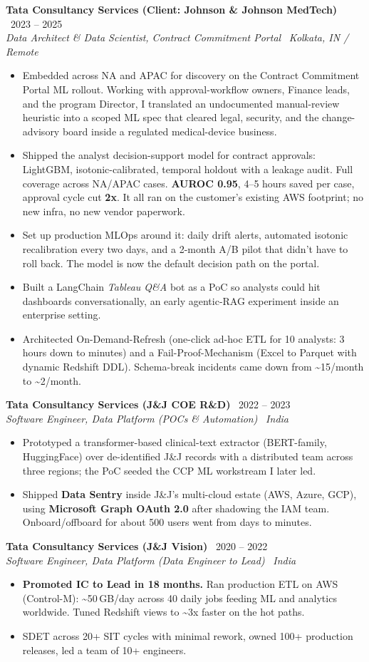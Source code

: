 \documentclass[letterpaper,11pt]{article}
\newcommand{\resumeItem}[1]{\item\small{{#1 \vspace{-2pt}}}}
\newcommand{\resumeSubheading}[4]{
  \vspace{-1pt}\item
    \textbf{#1} \textbar\ #2 \\
    \textit{#3} \textbar\ \textit{#4}
  \vspace{-5pt}
}
\newcommand{\resumeItemListStart}{\begin{itemize}}
\newcommand{\resumeItemListEnd}{\end{itemize}\vspace{-5pt}}
\begin{document}
  \resumeSubheading
    {Tata Consultancy Services (Client: Johnson \& Johnson MedTech)}{2023 -- 2025}
    {Data Architect \& Data Scientist, Contract Commitment Portal}{Kolkata, IN / Remote}
    \resumeItemListStart
      \resumeItem{Embedded across NA and APAC for discovery on the Contract Commitment Portal ML rollout. Working with approval-workflow owners, Finance leads, and the program Director, I translated an undocumented manual-review heuristic into a scoped ML spec that cleared legal, security, and the change-advisory board inside a regulated medical-device business.}
      \resumeItem{Shipped the analyst decision-support model for contract approvals: LightGBM, isotonic-calibrated, temporal holdout with a leakage audit. Full coverage across NA/APAC cases. \textbf{AUROC 0.95}, 4--5 hours saved per case, approval cycle cut \textbf{2x}. It all ran on the customer's existing AWS footprint; no new infra, no new vendor paperwork.}
      \resumeItem{Set up production MLOps around it: daily drift alerts, automated isotonic recalibration every two days, and a 2-month A/B pilot that didn't have to roll back. The model is now the default decision path on the portal.}
      \resumeItem{Built a LangChain \textit{Tableau Q\&A} bot as a PoC so analysts could hit dashboards conversationally, an early agentic-RAG experiment inside an enterprise setting.}
      \resumeItem{Architected On-Demand-Refresh (one-click ad-hoc ETL for 10 analysts: 3 hours down to minutes) and a Fail-Proof-Mechanism (Excel to Parquet with dynamic Redshift DDL). Schema-break incidents came down from \textasciitilde 15/month to \textasciitilde 2/month.}
    \resumeItemListEnd

  \resumeSubheading
    {Tata Consultancy Services (J\&J COE R\&D)}{2022 -- 2023}
    {Software Engineer, Data Platform (POCs \& Automation)}{India}
    \resumeItemListStart
      \resumeItem{Prototyped a transformer-based clinical-text extractor (BERT-family, HuggingFace) over de-identified J\&J records with a distributed team across three regions; the PoC seeded the CCP ML workstream I later led.}
      \resumeItem{Shipped \textbf{Data Sentry} inside J\&J's multi-cloud estate (AWS, Azure, GCP), using \textbf{Microsoft Graph OAuth 2.0} after shadowing the IAM team. Onboard/offboard for about 500 users went from days to minutes.}
    \resumeItemListEnd

  \resumeSubheading
    {Tata Consultancy Services (J\&J Vision)}{2020 -- 2022}
    {Software Engineer, Data Platform (Data Engineer to Lead)}{India}
    \resumeItemListStart
      \resumeItem{\textbf{Promoted IC to Lead in 18 months.} Ran production ETL on AWS (Control-M): \textasciitilde 50\,GB/day across 40 daily jobs feeding ML and analytics worldwide. Tuned Redshift views to \textasciitilde 3x faster on the hot paths.}
      \resumeItem{SDET across 20+ SIT cycles with minimal rework, owned 100+ production releases, led a team of 10+ engineers.}
    \resumeItemListEnd
\end{document}
